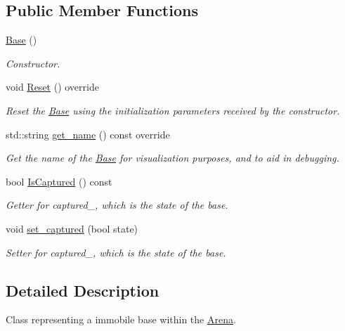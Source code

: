 \subsection*{Public Member Functions}
\begin{DoxyCompactItemize}
\item 
\hyperlink{classBase_a5ffe0568374d8b9b4c4ec32953fd6453}{Base} ()
\begin{DoxyCompactList}\small\item\em Constructor. \end{DoxyCompactList}\item 
void \hyperlink{classBase_aed35831f6e46b267305326389ec9d6da}{Reset} () override\hypertarget{classBase_aed35831f6e46b267305326389ec9d6da}{}\label{classBase_aed35831f6e46b267305326389ec9d6da}

\begin{DoxyCompactList}\small\item\em Reset the \hyperlink{classBase}{Base} using the initialization parameters received by the constructor. \end{DoxyCompactList}\item 
std\+::string \hyperlink{classBase_a02ef545d5165eed175f81c29f9881f07}{get\+\_\+name} () const override
\begin{DoxyCompactList}\small\item\em Get the name of the \hyperlink{classBase}{Base} for visualization purposes, and to aid in debugging. \end{DoxyCompactList}\item 
bool \hyperlink{classBase_a6a805a97e0a836cf354fd1e2e294d112}{Is\+Captured} () const 
\begin{DoxyCompactList}\small\item\em Getter for captured\+\_\+, which is the state of the base. \end{DoxyCompactList}\item 
void \hyperlink{classBase_a933e149b6a25c59ca631e2bb80a3c1df}{set\+\_\+captured} (bool state)\hypertarget{classBase_a933e149b6a25c59ca631e2bb80a3c1df}{}\label{classBase_a933e149b6a25c59ca631e2bb80a3c1df}

\begin{DoxyCompactList}\small\item\em Setter for captured\+\_\+, which is the state of the base. \end{DoxyCompactList}\end{DoxyCompactItemize}


\subsection{Detailed Description}
Class representing a immobile base within the \hyperlink{classArena}{Arena}. 

